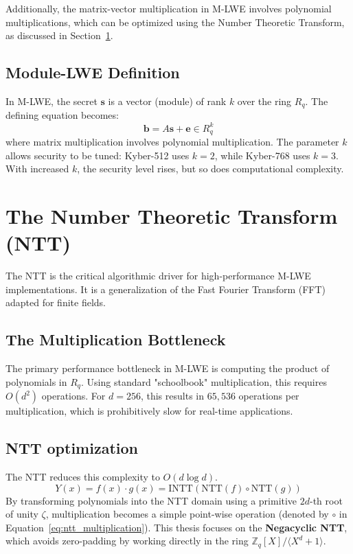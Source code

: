 Additionally, the matrix-vector multiplication in M-LWE involves polynomial multiplications, which can be optimized using the Number Theoretic Transform, as discussed in Section~\ref{sec:ntt}.

\subsection{Module-LWE Definition}
\label{subsec:module-lwe-definition}
In M-LWE, the secret $\mathbf{s}$ is a vector (module) of rank $k$ over the ring $R_q$.
The defining equation becomes:
\begin{equation}
    \mathbf{b} = A\mathbf{s} + \mathbf{e} \in R_q^k
\end{equation}
where matrix multiplication involves polynomial multiplication.
The parameter $k$ allows security to be tuned: Kyber-512 uses $k=2$, while Kyber-768 uses $k=3$.
With increased $k$, the security level rises, but so does computational complexity.

\section{The Number Theoretic Transform (NTT)}
\label{sec:ntt}

The NTT is the critical algorithmic driver for high-performance M-LWE implementations.
It is a generalization of the Fast Fourier Transform (FFT) adapted for finite fields.

\subsection{The Multiplication Bottleneck}
\label{subsec:the-multiplication-bottleneck}
The primary performance bottleneck in M-LWE is computing the product of polynomials in $R_q$.
Using standard "schoolbook" multiplication, this requires $O(d^2)$ operations.
For $d=256$, this results in $65,536$ operations per multiplication, which is prohibitively slow for real-time applications.

\subsection{NTT optimization}
\label{subsec:ntt-optimization}
The NTT reduces this complexity to $O(d \log d)$.
\begin{equation}
    \label{eq:ntt_multiplication}
    Y(x) = f(x) \cdot g(x) = \text{INTT}(\text{NTT}(f) \circ \text{NTT}(g))
\end{equation}
By transforming polynomials into the NTT domain using a primitive $2d$-th root of unity $\zeta$, multiplication becomes a simple point-wise operation (denoted by $\circ$ in Equation~\ref{eq:ntt_multiplication}).
This thesis focuses on the \textbf{Negacyclic NTT}, which avoids zero-padding by working directly in the ring $\mathbb{Z}_q[X] / \langle X^d + 1 \rangle$.

